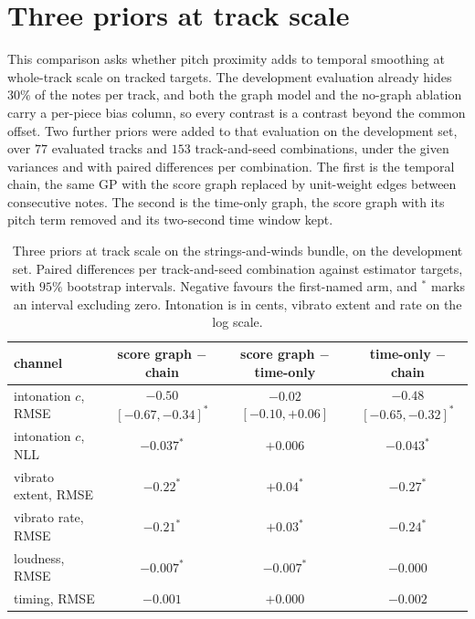\documentclass[11pt,a4paper]{report}
\begin{document}
\section{Three priors at track scale}
\label{app:trackscale}
This comparison asks whether pitch proximity adds to temporal smoothing at
whole-track scale on tracked targets. The development evaluation
already hides $30\%$ of the notes per track, and both the graph model
and the no-graph ablation carry a per-piece bias column, so every contrast
is a contrast beyond the common offset. Two further priors were added to
that evaluation on the development set, over $77$ evaluated tracks and $153$ track-and-seed combinations, under the
given variances and with paired differences per combination. The first is
the temporal chain, the same GP with the score graph replaced by
unit-weight edges between consecutive notes. The second is the time-only
graph, the score graph with its pitch term removed and its two-second time
window kept.

\begin{table}[t]\centering
\caption{Three priors at track scale on the strings-and-winds bundle, on
the development set. Paired differences per track-and-seed combination
against estimator targets, with $95\%$ bootstrap intervals. Negative
favours the first-named arm, and $^{*}$ marks an interval excluding zero.
Intonation is in cents, vibrato extent and rate on the log scale.}
\label{tab:trackscale}
\footnotesize
\begin{tabular}{@{}lccc@{}}
\toprule
channel & score graph $-$ chain & score graph $-$ time-only & time-only $-$ chain \\
\midrule
intonation $c$, RMSE & $-0.50$ $[-0.67,-0.34]^{*}$ & $-0.02$ $[-0.10,+0.06]$ & $-0.48$ $[-0.65,-0.32]^{*}$ \\
intonation $c$, NLL & $-0.037^{*}$ & $+0.006$ & $-0.043^{*}$ \\
vibrato extent, RMSE & $-0.22^{*}$ & $+0.04^{*}$ & $-0.27^{*}$ \\
vibrato rate, RMSE & $-0.21^{*}$ & $+0.03^{*}$ & $-0.24^{*}$ \\
loudness, RMSE & $-0.007^{*}$ & $-0.007^{*}$ & $-0.000$ \\
timing, RMSE & $-0.001$ & $+0.000$ & $-0.002$ \\
\bottomrule
\end{tabular}
\end{table}
\end{document}
